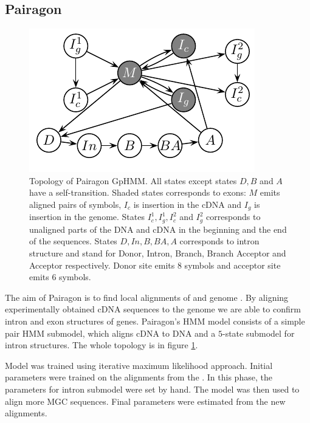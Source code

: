 \subsection{Pairagon}

\begin{figure}
\begin{center}
\includegraphics{../figures/pairagon.pdf}
\end{center}
\caption[Topology of Pairagon generalized pair hidden Markov model.]{
Topology of Pairagon GpHMM. All states except states
$D,B$ and $A$ have a self-transition.
Shaded states corresponds to exons: $M$ emits
aligned pairs of symbols, $I_c$ is insertion in the cDNA and $I_g$ is
insertion in the genome. States $I^1_c,I^1_g,I^2_c$ and $I^2_g$ corresponds to
unaligned parts of the DNA and cDNA in the beginning and the end of the
sequences. States $D,In,B,BA,A$ corresponds to intron structure and stand for 
Donor, Intron, Branch, Branch Acceptor and Acceptor respectively.
Donor site emits $8$ symbols and acceptor site emits $6$ symbols.
}\label{FIGURE:PAIRAGON}
\end{figure}


The aim of Pairagon is to find local alignments of  and genome \cite{Pairagon2009}. By aligning experimentally obtained
cDNA sequences to the genome we are able to confirm intron and exon structures
of genes.  Pairagon's HMM model consists of a simple pair HMM submodel, which
aligns cDNA to DNA and a $5$-state submodel for intron structures. The whole
topology is in figure \ref{FIGURE:PAIRAGON}. 

Model was trained using iterative maximum likelihood approach.  Initial
parameters were trained on the alignments from the . In this phase, the parameters for intron submodel were set by
hand. The model was then used to align more MGC sequences. Final parameters were
estimated from the new alignments.

